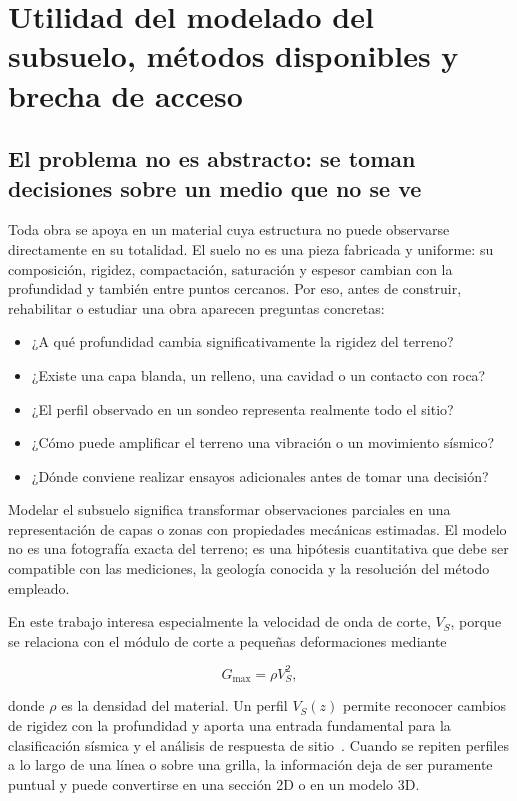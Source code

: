 \section{Utilidad del modelado del subsuelo, métodos disponibles y brecha de acceso}
\label{sec:problema-modelado}

\subsection{El problema no es abstracto: se toman decisiones sobre un medio que no se ve}

Toda obra se apoya en un material cuya estructura no puede observarse directamente en
su totalidad. El suelo no es una pieza fabricada y uniforme: su composición, rigidez,
compactación, saturación y espesor cambian con la profundidad y también entre puntos
cercanos. Por eso, antes de construir, rehabilitar o estudiar una obra aparecen
preguntas concretas:

\begin{itemize}
    \item ¿A qué profundidad cambia significativamente la rigidez del terreno?
    \item ¿Existe una capa blanda, un relleno, una cavidad o un contacto con roca?
    \item ¿El perfil observado en un sondeo representa realmente todo el sitio?
    \item ¿Cómo puede amplificar el terreno una vibración o un movimiento sísmico?
    \item ¿Dónde conviene realizar ensayos adicionales antes de tomar una decisión?
\end{itemize}

Modelar el subsuelo significa transformar observaciones parciales en una
representación de capas o zonas con propiedades mecánicas estimadas. El modelo no es
una fotografía exacta del terreno; es una hipótesis cuantitativa que debe ser compatible
con las mediciones, la geología conocida y la resolución del método empleado.

En este trabajo interesa especialmente la velocidad de onda de corte, $V_S$, porque se
relaciona con el módulo de corte a pequeñas deformaciones mediante

\begin{equation}
    G_{\max}=\rho V_S^2,
\end{equation}

donde $\rho$ es la densidad del material. Un perfil $V_S(z)$ permite reconocer cambios
de rigidez con la profundidad y aporta una entrada fundamental para la clasificación
sísmica y el análisis de respuesta de sitio~\cite{Kramer1996,Foti2014}. Cuando se
repiten perfiles a lo largo de una línea o sobre una grilla, la información deja de ser
puramente puntual y puede convertirse en una sección 2D o en un modelo 3D.

